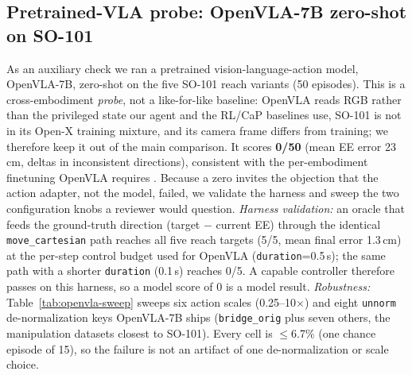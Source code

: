 \subsection{Pretrained-VLA probe: OpenVLA-7B zero-shot on SO-101}
\label{app:openvla-sweep}

As an auxiliary check we ran a pretrained vision-language-action model,
OpenVLA-7B, zero-shot on the five SO-101 reach variants
(50 episodes). This is a cross-embodiment \emph{probe}, not a
like-for-like baseline: OpenVLA reads RGB rather than the privileged
state our agent and the RL/CaP baselines use, SO-101 is not in its
Open-X training mixture, and its camera frame differs from training; we
therefore keep it out of the main comparison. It scores \textbf{0/50}
(mean EE error 23\,cm, deltas in inconsistent directions), consistent
with the per-embodiment finetuning OpenVLA requires
\citep[\S 3]{kim2024openvla}. Because a zero invites the objection that
the action adapter, not the model, failed, we validate the harness and
sweep the two configuration knobs a reviewer would question. \emph{Harness validation:} an oracle that feeds
the ground-truth direction (target $-$ current EE) through the identical
\texttt{move\_cartesian} path reaches all five reach targets (5/5, mean
final error 1.3\,cm) at the per-step control budget used for OpenVLA
(\texttt{duration}{=}0.5\,s); the same path with a shorter
\texttt{duration} (0.1\,s) reaches 0/5. A capable
controller therefore passes on this harness, so a model score of 0 is a
model result. \emph{Robustness:} Table~\ref{tab:openvla-sweep} sweeps
six action scales (0.25--10$\times$) and eight \texttt{unnorm}
de-normalization keys OpenVLA-7B ships (\texttt{bridge\_orig} plus
seven others, the manipulation datasets closest to SO-101). Every cell is $\leq$6.7\% (one chance episode of
15), so the failure is not an artifact of one de-normalization or scale
choice.

